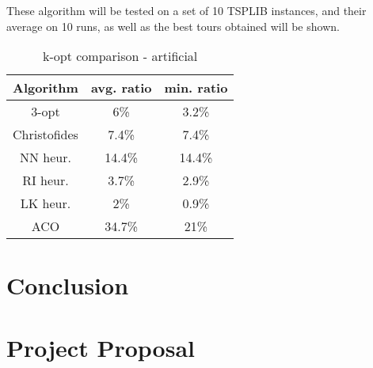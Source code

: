 \documentclass[12pt,twoside,notitlepage]{report}
\begin{document}
These algorithm will be tested on a set of 10 TSPLIB instances, and their average on 10 runs, as well as the best tours obtained will be shown.

\begin{table}[h!]
\centering
\begin{tabular}{||c || c | c ||} 
 \hline
 Algorithm & avg. ratio & min. ratio \\[0.5ex] 
 \hline\hline
 $3$-opt & 6\% & 3.2\% \\
 Christofides & 7.4\% & 7.4\% \\  
 NN heur. & 14.4\% & 14.4\% \\
 RI heur. & 3.7\% & 2.9\% \\
 LK heur. & 2\% & 0.9\%\\
 ACO  & 34.7\% & 21\%\\
 \hline
\end{tabular}
\caption{k-opt comparison - artificial}
\label{comparison:7}
\end{table}

\cleardoublepage
\chapter{Conclusion}

\cleardoublepage



\cleardoublepage

\appendix

\cleardoublepage


\cleardoublepage

\chapter{Project Proposal}


\end{document}

